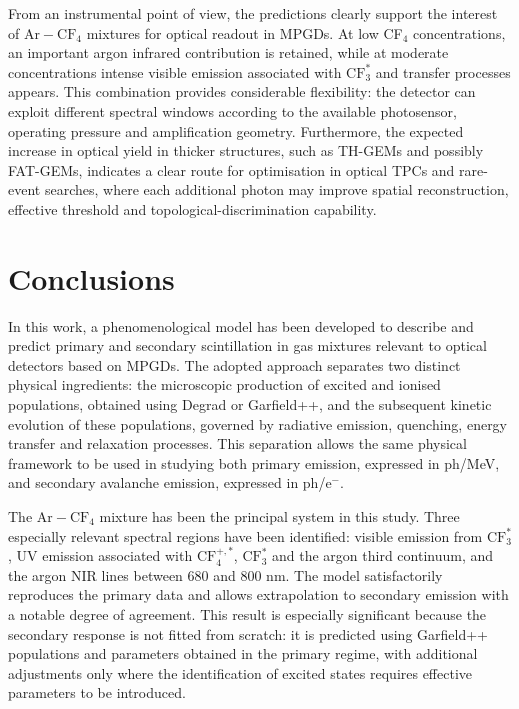 \documentclass[12pt,a4paper]{article}
\newcommand{\Ar}{\mathrm{Ar}}
\newcommand{\CF}{\mathrm{CF}}
\begin{document}
From an instrumental point of view, the predictions clearly support the interest of $\Ar-\CF_4$ mixtures for optical readout in MPGDs. At low CF$_4$ concentrations, an important argon infrared contribution is retained, while at moderate concentrations intense visible emission associated with $\CF_3^*$ and transfer processes appears. This combination provides considerable flexibility: the detector can exploit different spectral windows according to the available photosensor, operating pressure and amplification geometry. Furthermore, the expected increase in optical yield in thicker structures, such as TH-GEMs and possibly FAT-GEMs, indicates a clear route for optimisation in optical TPCs and rare-event searches, where each additional photon may improve spatial reconstruction, effective threshold and topological-discrimination capability.

\section{Conclusions}

In this work, a phenomenological model has been developed to describe and predict primary and secondary scintillation in gas mixtures relevant to optical detectors based on MPGDs. The adopted approach separates two distinct physical ingredients: the microscopic production of excited and ionised populations, obtained using Degrad or Garfield++, and the subsequent kinetic evolution of these populations, governed by radiative emission, quenching, energy transfer and relaxation processes. This separation allows the same physical framework to be used in studying both primary emission, expressed in ph/MeV, and secondary avalanche emission, expressed in ph/e$^-$.

The $\Ar-\CF_4$ mixture has been the principal system in this study. Three especially relevant spectral regions have been identified: visible emission from $\CF_3^*$, UV emission associated with $\CF_4^{+,*}$, $\CF_3^*$ and the argon third continuum, and the argon NIR lines between 680 and 800 nm. The model satisfactorily reproduces the primary data and allows extrapolation to secondary emission with a notable degree of agreement. This result is especially significant because the secondary response is not fitted from scratch: it is predicted using Garfield++ populations and parameters obtained in the primary regime, with additional adjustments only where the identification of excited states requires effective parameters to be introduced.
\end{document}
